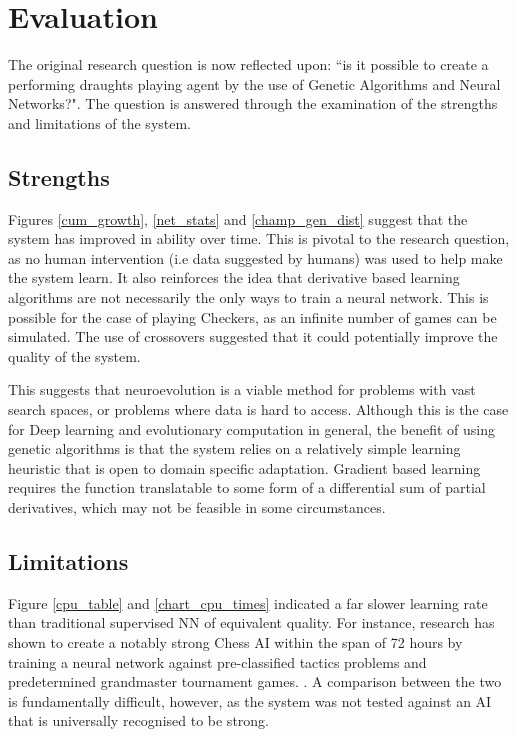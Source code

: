\documentclass[12pt,a4paper]{article}
\begin{document}
\section{Evaluation}
 

    The original research question is now reflected upon: ``is it possible to create a performing draughts playing agent by the use of Genetic Algorithms and Neural Networks?".  The question is answered through the examination of the strengths and limitations of the system.

    \subsection{Strengths}

    Figures \ref{cum_growth}, \ref{net_stats} and \ref{champ_gen_dist} suggest that the system has improved in ability over time. This is pivotal to the research question, as no human intervention (i.e data suggested by humans) was used to help make the system learn. It also reinforces the idea that derivative based learning algorithms are not necessarily the only ways to train a neural network. This is possible for the case of playing Checkers, as an infinite number of games can be simulated. The use of crossovers suggested that it could potentially improve the quality of the system.
    
    This suggests that neuroevolution is a viable method for problems with vast search spaces, or problems where data is hard to access. Although this is the case for Deep learning and evolutionary computation in general, the benefit of using genetic algorithms is that the system relies on a relatively simple learning heuristic that is open to domain specific adaptation. Gradient based learning requires the function  translatable to some form of a differential sum of partial derivatives, which may not be feasible in some circumstances.

    \subsection{Limitations}
    Figure \ref{cpu_table} and \ref{chart_cpu_times} indicated a far slower learning rate than traditional supervised NN of equivalent quality. For instance, research has shown to create a notably strong Chess AI within the span of 72 hours by training a neural network against pre-classified tactics problems and predetermined grandmaster tournament games. \cite{lai_giraffe:_2015}. A comparison between the two is fundamentally difficult, however, as the system was not tested against an AI that is universally recognised to be strong.
\end{document}
